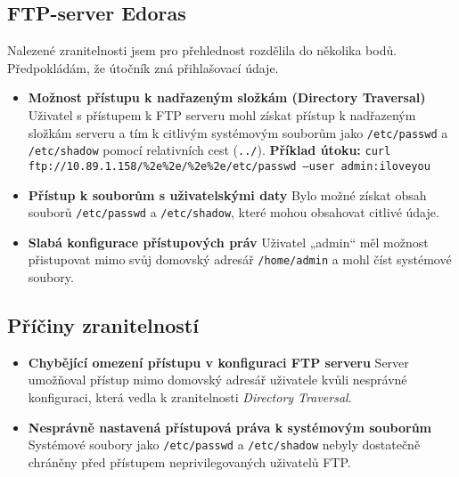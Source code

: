\documentclass{article}
\begin{document}
\subsection{FTP-server Edoras}
Nalezené zranitelnosti jsem pro přehlednost rozdělila do několika bod\r u. Předpokládám, že \' utočník zná přihlašovací \' udaje.
\begin{itemize}[leftmargin=2em]
    \item \textbf{Možnost přístupu k nadřazeným složkám (Directory Traversal)}  
    Uživatel s přístupem k FTP serveru mohl získat přístup k nadřazeným složkám serveru a tím k citlivým systémovým souborům jako \texttt{/etc/passwd} a \texttt{/etc/shadow} pomocí relativních cest (\texttt{../}).  
    \textbf{Příklad útoku:}  
    \texttt{curl ftp://10.89.1.158/\%2e\%2e/\%2e\%2e/etc/passwd --user admin:iloveyou}
    
    \item \textbf{Přístup k souborům s uživatelskými daty}  
    Bylo možné získat obsah souborů \texttt{/etc/passwd} a \texttt{/etc/shadow}, které mohou obsahovat citlivé \' udaje.

    \item \textbf{Slabá konfigurace přístupových práv}  
    Uživatel „admin“ měl možnost přistupovat mimo svůj domovský adresář \texttt{/home/admin} a mohl číst systémové soubory.

\end{itemize}

\subsection*{Příčiny zranitelností}
\begin{itemize}[leftmargin=2em]
    \item \textbf{Chybějící omezení přístupu v konfiguraci FTP serveru}  
    Server umožňoval přístup mimo domovský adresář uživatele kvůli nesprávné konfiguraci, která vedla k zranitelnosti \textit{Directory Traversal}.

    \item \textbf{Nesprávně nastavená přístupová práva k systémovým souborům}  
    Systémové soubory jako \texttt{/etc/passwd} a \texttt{/etc/shadow} nebyly dostatečně chráněny před přístupem neprivilegovaných uživatelů FTP.
\end{itemize}
\end{document}
